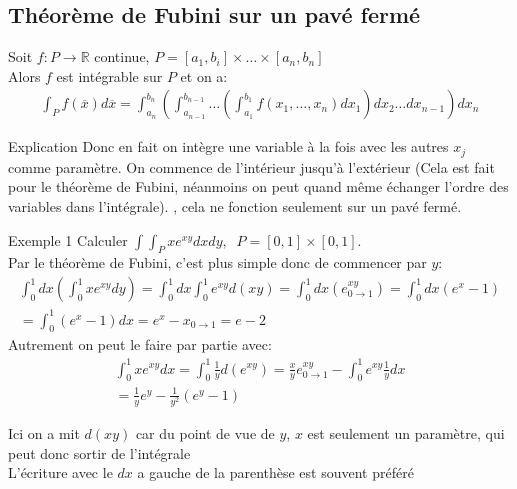\subsection{Théorème de Fubini sur un pavé fermé}
\begin{theoreme}
    Soit $f: P \to \mathbb{R}$ continue, $P =  \left[a_1, b_i\right] \times \ldots \times \left[a_n, b_n\right]$\\
    Alors $f$ est intégrable sur $P$ et on a:
    \begin{align*} \int_P f\left(\overline{x}\right)d\overline{x} = \int_{a_n}^{b_n}\left(\int_{a_{n-1}}^{b_{n-1}}\ldots \left(\int_{a_1}^{b_1} f\left(x_1, \ldots, x_n\right)dx_1\right)dx_2\ldots dx_{n-1}\right)dx_n \end{align*}
\end{theoreme}
\begin{parag}{Explication}
    Donc en fait on intègre une variable à la fois avec les autres $x_j$ comme paramètre.  On commence de l'intérieur  jusqu'à l'extérieur (Cela est fait pour le théorème de Fubini, néanmoins on peut quand même échanger l'ordre des variables dans l'intégrale). ,  cela ne fonction seulement sur un pavé fermé.\\

\end{parag}
\begin{parag}{Exemple 1}
    Calculer $\int\int_P xe^{xy}dxdy, \; \; P =  \left[0, 1\right] \times \left[0, 1\right]$.\\
    Par le théorème de Fubini,  c'est plus simple donc de commencer par $y$:
    \begin{align*} 
        \int_0^1dx\left(\int_0^1xe^{xy} dy\right) =  \int_0^1dx \int_0^1e^{xy}d\left(xy\right) =  \int_0^1dx \left(e^{xy}_{0 \to 1}\right) =  \int_0^1 dx \left(e^x - 1\right)\\
        = \int_0^1 \left(e^x - 1\right)dx =  e^x - x_{0 \to 1} =  e  -2
    \end{align*}
    Autrement on peut le faire par partie avec:
    \begin{align*} 
        \int_0^1 xe^{xy}dx =  \int_0^1 \frac{1}{y}d\left(e^{xy}\right) =  \frac{x}{y}e^{xy}_{0 \to 1} - \int_0^1 e^{xy} \frac{1}{y}dx \\
        =  \frac{1}{y}e^y - \frac{1}{y^2}\left(e^y - 1\right)
    \end{align*}
    \begin{framedremark}
        Ici on a mit $d\left(xy\right)$ car du point de vue de $y$, $x$ est seulement un paramètre, qui peut donc sortir de l'intégrale\\
        L'écriture avec le $dx$ a gauche de la parenthèse est souvent préféré
    \end{framedremark}
\end{parag}
